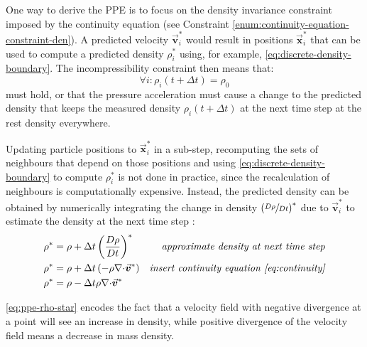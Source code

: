 \documentclass[oneside, a4paper]{book}
\newcommand\vek[1]{\vec{\bm{#1}}}
\newcommand\br[1]{\left(#1\right)}
\newcommand\divergence{{\nabla\cdot}}
\begin{document}
    One way to derive the PPE is to focus on the density invariance constraint imposed by the continuity equation (see Constraint \ref{enum:continuity-equation-constraint-den}). A predicted velocity $\vek{v}_i^*$ would result in positions $\vek{x}_i^*$ that can be used to compute a predicted density $\rho_i^*$ using, for example, \autoref{eq:discrete-density-boundary}. The incompressibility constraint then means that:
    \begin{equation}\label{eq:ppe-incompressibility-constraint}
      \forall i: \rho_i\br{t+\Delta t}=\rho_0
    \end{equation} 
    must hold, or that the pressure acceleration must cause a change to the predicted density that keeps the measured density $\rho_i\br{t+\Delta t}$ at the next time step at the rest density everywhere.
    
    Updating particle positions to $\vek{x}_i^*$ in a sub-step, recomputing the sets of neighbours that depend on those positions and using \autoref{eq:discrete-density-boundary} to compute $\rho_i^*$ is not done in practice, since the recalculation of neighbours is computationally expensive. Instead, the predicted density can be obtained by numerically integrating the change in density $\br{\sfrac{D\rho}{Dt}}^*$ due to $\vek{v}_i^*$ to estimate the density at the next time step \autocite{tutorial2019}:
    \begin{align}
      \rho^* &= \rho + \Delta t \br{\frac{D\rho}{D t}}^* &\textit{approximate density at next time step}\\
      \rho^*&=\rho + \Delta t \br{-\rho\divergence\vek{v}^*} &\textit{insert continuity equation \ref{eq:continuity}}\\
      \rho^* &= \rho - \Delta t \rho \divergence \vek{v}^* \label{eq:ppe-rho-star}
    \end{align}

    \autoref{eq:ppe-rho-star} encodes the fact that a velocity field with negative divergence at a point will see an increase in density, while positive divergence of the velocity field means a decrease in mass density. 
\end{document}
